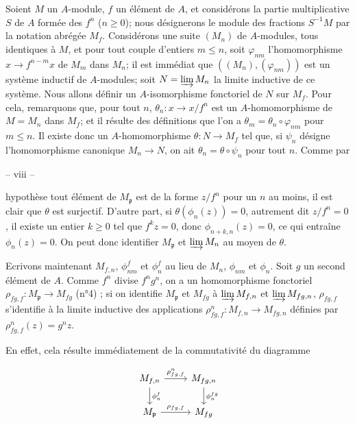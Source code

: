 Soient $M$ un $A$-module, $f$ un élément de $A$, et considérons la partie multiplicative $S$ de $A$ formée des $f^n$ ($n \geq 0$); nous désignerons le module des fractions $S^{-1}M$ par la notation abrégée $M_f$. Considérons une suite $(M_n)$ de $A$-modules, tous identiques à $M$, et pour tout couple d'entiers $m \leq n$, soit $\varphi_{nm}$ l'homomorphisme $x \to f^{n-m}x$ de $M_m$ dans $M_n$; il est immédiat que $((M_n), (\varphi_{nm}))$ est un système inductif de $A$-modules; soit $N = \varinjlim M_n$ la limite inductive de ce système. Nous allons définir un $A$-isomorphisme fonctoriel de $N$ sur $M_f$. Pour cela, remarquons que, pour tout $n$, $\theta_n : x \to x/f^n$ est un $A$-homomorphisme de $M = M_n$ dans $M_f$; et il résulte des définitions que l'on a $\theta_m = \theta_n \circ \varphi_{nm}$ pour $m \leq n$. Il existe donc un $A$-homomorphisme $\theta : N \to M_f$ tel que, si $\psi_n$ désigne l'homomorphisme canonique $M_n \to N$, on ait $\theta_n = \theta \circ \psi_n$ pour tout $n$. Comme par

\newpage


-- viii --

hypothèse tout élément de $M_{\mathfrak{p}}$ est de la forme $z/f^n$ pour un $n$ au moins, il est clair que $\theta$ est surjectif. D'autre part, si $\theta(\phi_n(z)) = 0$, autrement dit $z/f^n = 0$, il existe un entier $k \geq 0$ tel que $f^k z = 0$, donc $\phi_{n+k, n}(z) = 0$, ce qui entraîne $\phi_n(z) = 0$. On peut donc identifier $M_{\mathfrak{p}}$ et $\varinjlim M_n$ au moyen de $\theta$.

Ecrivons maintenant $M_{f,n}$, $\phi_{nm}^f$ et $\phi_n^f$ au lieu de $M_n$, $\phi_{nm}$ et $\phi_n$. Soit $g$ un second élément de $A$. Comme $f^n$ divise $f^n g^n$, on a un homomorphisme fonctoriel $\rho_{fg, f} : M_{\mathfrak{p}} \to M_{fg}$ (n°4) ; si on identifie $M_{\mathfrak{p}}$ et $M_{fg}$ à $\varinjlim M_{f,n}$ et $\varinjlim M_{fg,n}$, $\rho_{fg, f}$ s'identifie à la limite inductive des applications $\rho_{fg, f}^n : M_{f,n} \to M_{fg,n}$ définies par $\rho_{fg, f}^n(z) = g^n z$.

En effet, cela résulte immédiatement de la commutativité du diagramme

$$\begin{tikzcd}
M_{f,n} \arrow[r, "\rho_{fg, f}^n"] \arrow[d, "\phi_n^f"] & M_{fg,n} \arrow[d, "\phi_n^{fg}"] \\
M_{\mathfrak{p}} \arrow[r, "\rho_{fg, f}"] & M_{fg}
\end{tikzcd}$$

